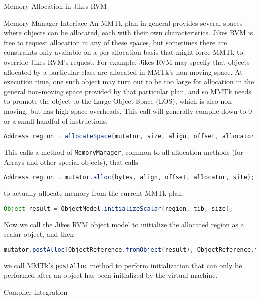 \begin{section}{Memory Allocation in Jikes RVM}
\begin{subsection}{Memory Manager Interface}
An MMTk plan in general provides several spaces where objects can be allocated, each with their own characteristics.  Jikes RVM is free to request allocation in any of these spaces, but sometimes there are constraints only available on a per-allocation basis that might force MMTk to override Jikes RVM's request.  For example, Jikes RVM may specify that objects allocated by a particular class are allocated in MMTk's non-moving space.  At execution time, one such object may turn out to be too large for allocation in the general non-moving space provided by that particular plan, and so MMTk needs to promote the object to the Large Object Space (LOS), which is also non-moving, but has high space overheads. This call will generally compile down to 0 or a small handful of instructions.

\begin{lstlisting}[language=Java]
Address region = allocateSpace(mutator, size, align, offset, allocator, site);
\end{lstlisting}

This calls a method of \texttt{MemoryManager}, common to all allocation methods (for Arrays and other special objects), that calls

\begin{lstlisting}[language=Java]
Address region = mutator.alloc(bytes, align, offset, allocator, site);
\end{lstlisting}

to actually allocate memory from the current MMTk plan.

\begin{lstlisting}[language=Java]
Object result = ObjectModel.initializeScalar(region, tib, size);
\end{lstlisting}

Now we call the Jikes RVM object model to initialize the allocated region as a scalar object, and then

\begin{lstlisting}[language=Java]
mutator.postAlloc(ObjectReference.fromObject(result), ObjectReference.fromObject(tib), size, allocator);
\end{lstlisting}

we call MMTk's \texttt{postAlloc} method to perform initialization that can only be performed after an object has been initialized by the virtual machine.

\end{subsection}

\begin{subsection}{Compiler integration}


\end{subsection}
\end{section}
